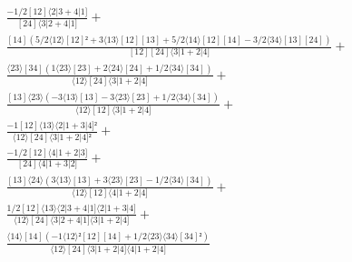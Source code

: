 \documentclass[varwidth, border=5pt]{standalone}
\begin{document}
\begin{my}
$\begin{gathered}
\scriptscriptstyle\frac{-1/2[12]⟨2|3+4|1]}{[24]⟨3|2+4|1]} +\\
\scriptscriptstyle\frac{[14](5/2⟨12⟩[12]²+3⟨13⟩[12][13]+5/2⟨14⟩[12][14]-3/2⟨34⟩[13][24])}{[12][24]⟨3|1+2|4]} +\\
\scriptscriptstyle\frac{⟨23⟩[34](1⟨23⟩[23]+2⟨24⟩[24]+1/2⟨34⟩[34])}{⟨12⟩[24]⟨3|1+2|4]} +\\
\scriptscriptstyle\frac{[13]⟨23⟩(-3⟨13⟩[13]-3⟨23⟩[23]+1/2⟨34⟩[34])}{⟨12⟩[12]⟨3|1+2|4]} +\\
\scriptscriptstyle\frac{-1[12]⟨13⟩⟨2|1+3|4]²}{⟨12⟩[24]⟨3|1+2|4]²} +\\
\scriptscriptstyle\frac{-1/2[12]⟨4|1+2|3]}{[24]⟨4|1+3|2]} +\\
\scriptscriptstyle\frac{[13]⟨24⟩(3⟨13⟩[13]+3⟨23⟩[23]-1/2⟨34⟩[34])}{⟨12⟩[12]⟨4|1+2|4]} +\\
\scriptscriptstyle\frac{1/2[12]⟨13⟩⟨2|3+4|1]⟨2|1+3|4]}{⟨12⟩[24]⟨3|2+4|1]⟨3|1+2|4]} +\\
\scriptscriptstyle\frac{⟨14⟩[14](-1⟨12⟩²[12][14]+1/2⟨23⟩⟨34⟩[34]²)}{⟨12⟩[24]⟨3|1+2|4]⟨4|1+2|4]} \phantom{+}
\end{gathered}$
\end{my}
\end{document}
